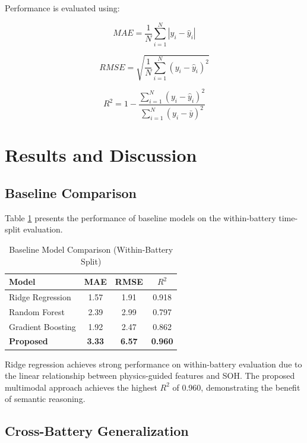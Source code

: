 \documentclass[conference]{IEEEtran}
\begin{document}
Performance is evaluated using:

\begin{equation}
    MAE = \frac{1}{N}\sum_{i=1}^{N}|y_i - \hat{y}_i|
\end{equation}

\begin{equation}
    RMSE = \sqrt{\frac{1}{N}\sum_{i=1}^{N}(y_i - \hat{y}_i)^2}
\end{equation}

\begin{equation}
    R^2 = 1 - \frac{\sum_{i=1}^{N}(y_i - \hat{y}_i)^2}{\sum_{i=1}^{N}(y_i - \bar{y})^2}
\end{equation}

\section{Results and Discussion}

\subsection{Baseline Comparison}

Table \ref{tab:baseline} presents the performance of baseline models on the within-battery time-split evaluation.

\begin{table}[htbp]
\caption{Baseline Model Comparison (Within-Battery Split)}
\label{tab:baseline}
\centering
\small
\begin{tabular}{lccc}
\toprule
\textbf{Model} & \textbf{MAE} & \textbf{RMSE} & \textbf{$R^2$} \\
\midrule
Ridge Regression & 1.57 & 1.91 & 0.918 \\
Random Forest & 2.39 & 2.99 & 0.797 \\
Gradient Boosting & 1.92 & 2.47 & 0.862 \\
\midrule
\textbf{Proposed} & \textbf{3.33} & \textbf{6.57} & \textbf{0.960} \\
\bottomrule
\end{tabular}
\end{table}

Ridge regression achieves strong performance on within-battery evaluation due to the linear relationship between physics-guided features and SOH. The proposed multimodal approach achieves the highest $R^2$ of 0.960, demonstrating the benefit of semantic reasoning.

\subsection{Cross-Battery Generalization}
\end{document}
